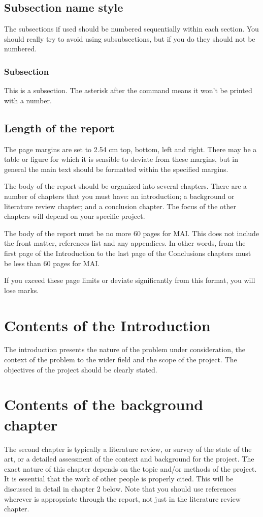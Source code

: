 \subsection{Subsection name style}
The subsections if used should be numbered sequentially within each section. You should really try to avoid using subsubsections, but if you do they should not be numbered.

\subsubsection*{Subsection}
This is a subsection. The asterisk after the command means it won't be printed with a number.

\subsection{Length of the report}
The page margins are set to 2.54 cm top, bottom, left and right. There may be a table or figure for which it is sensible to deviate from these margins, but in general the main text should be formatted within the specified margins.

The body of the report should be organized into several chapters. There are a number of chapters that you must have: an introduction; a background or literature review chapter; and a conclusion chapter. The focus of the other chapters will depend on your specific project.

The body of the report must be no more 60 pages for MAI. This does not include the front matter, references list and any appendices. In other words, from the first page of the Introduction to the last page of the Conclusions chapters must be less than 60 pages for MAI.

If you exceed these page limits or deviate significantly from this format, you will lose marks.

\section{Contents of the Introduction}
The introduction presents the nature of the problem under consideration, the context of the problem to the wider field and the scope of the project. The objectives of the project should be clearly stated.

\section{Contents of the background chapter}
The second chapter is typically a literature review, or survey of the state of the art, or a detailed assessment of the context and background for the project. The exact nature of this chapter depends on the topic and/or methods of the project. It is essential that the work of other people is properly cited. This will be discussed in detail in chapter 2 below. Note that you should use references wherever is appropriate through the report, not just in the literature review chapter.

